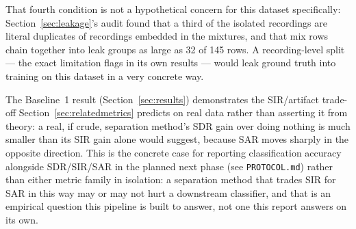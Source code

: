 \documentclass[11pt]{article}
\begin{document}
That fourth condition is not a hypothetical concern for this dataset
specifically: Section~\ref{sec:leakage}'s audit found that a third of the
isolated recordings are literal duplicates of recordings embedded in the
mixtures, and that mix rows chain together into leak groups as large as 32
of 145 rows. A recording-level split --- the exact limitation \cite{nmfcrnn}
flags in its own results --- would leak ground truth into training on this
dataset in a very concrete way.

The Baseline~1 result (Section~\ref{sec:results}) demonstrates the
SIR/artifact trade-off Section~\ref{sec:relatedmetrics} predicts on real
data rather than asserting it from theory: a real, if crude, separation
method's SDR gain over doing nothing is much smaller than its SIR gain alone
would suggest, because SAR moves sharply in the opposite direction. This is
the concrete case for reporting classification accuracy alongside SDR/SIR/SAR
in the planned next phase (see \texttt{PROTOCOL.md}) rather than either
metric family in isolation: a separation method that trades SIR for SAR in
this way may or may not hurt a downstream classifier, and that is an
empirical question this pipeline is built to answer, not one this report
answers on its own.
\end{document}
